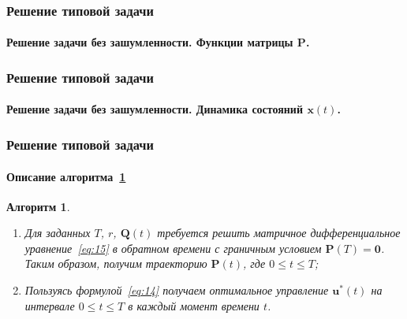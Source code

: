 \documentclass[ignorenonframetext,hyperref={pdftex,unicode},compress]{beamer}
\newtheorem{alg}{Алгоритм}
\begin{document}
\begin{frame}
	\frametitle{Решение типовой задачи}
	\framesubtitle{Решение задачи без зашумленности. Функции матрицы $\mathbf{P}$.}
    
    \begin{figure}\center
        
        \label{fig:p}
    \end{figure}
\end{frame}



\begin{frame}
	\frametitle{Решение типовой задачи}
	\framesubtitle{Решение задачи без зашумленности. Динамика состояний $\mathbf{x}(t)$.}
    
    \begin{figure}\center
        
        \label{fig:x}
    \end{figure}
\end{frame}



\begin{frame}
	\frametitle{Решение типовой задачи}
	\framesubtitle{Описание алгоритма~\ref{alg:1}}
    
    \begin{alg}\label{alg:1}~
        \begin{enumerate}
            \item
                Для заданных $T$, $r$, $\mathbf{Q}(t)$ требуется решить матричное дифференциальное уравнение~\ref{eq:15} в обратном времени с граничным условием $\mathbf{P}(T) = \mathbf{0}$. Таким образом, получим траекторию $\mathbf{P}(t)$, где $0 \leqslant t \leqslant T$;

            \item
                Пользуясь формулой~\ref{eq:14} получаем оптимальное управление $\mathbf{u}^*(t)$ на интервале $0 \leqslant t \leqslant T$ в каждый момент времени $t$.
        \end{enumerate}
    \end{alg}
\end{frame}
\end{document}
